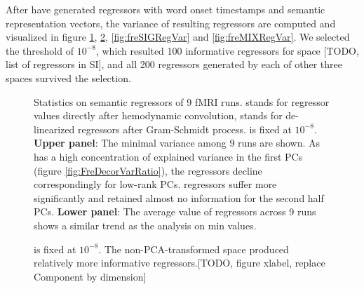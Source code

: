 After have generated regressors with word onset timestamps and semantic representation vectors, the variance of resulting regressors are computed and visualized in figure \ref{fig:freSIMRegVar}, \ref{fig:freASNRegVar}, \ref{fig:freSIGRegVar} and \ref{fig:freMIXRegVar}. We selected the threshold of \(10^{-8}\), which resulted 100 informative regressors for  space [TODO, list of regressors in SI], and all 200 regressors generated by each of other three spaces survived the selection. 

\begin{figure}
    \centering
    \caption[French  Regressor Variances]{Statistics on semantic regressors of 9 fMRI runs.  stands for regressor values directly after hemodynamic convolution,  stands for de-linearized regressors after Gram-Schmidt process.  is fixed at \(10^{-8}\). \textbf{Upper panel}: The minimal variance among 9 runs are shown. As  has a high concentration of explained variance in the first PCs (figure \ref{fig:FreDecorVarRatio}), the  regressors decline correspondingly for low-rank PCs.  regressors suffer more significantly and retained almost no information for the second half PCs. \textbf{Lower panel}: The average value of regressors across 9 runs shows a similar trend as the analysis on min values.} 
    \label{fig:freSIMRegVar}
\end{figure}

\begin{figure}
    \centering
    \caption[French  Regressor Variances]{ is fixed at \(10^{-8}\). The non-PCA-transformed  space produced relatively more informative regressors.[TODO, figure xlabel, replace Component by dimension]} 
    \label{fig:freASNRegVar}
\end{figure}





